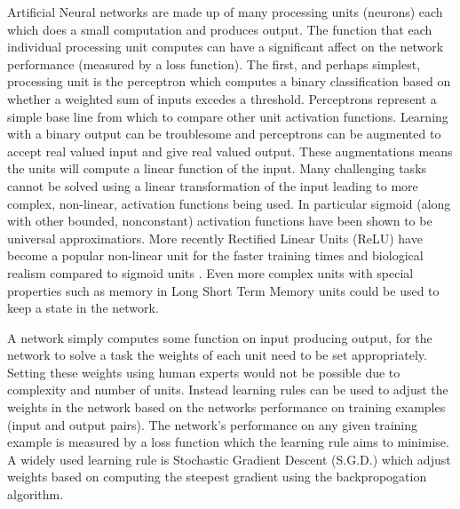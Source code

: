 Artificial Neural networks are made up of many processing units (neurons) each which does a small computation and produces output. 
The function that each individual processing unit computes can have a significant affect on the network performance (measured by a loss function). 
The first, and perhaps simplest, processing unit is the perceptron which computes a binary classification based on whether a weighted sum of inputs excedes a threshold.
Perceptrons represent a simple base line from which to compare other unit activation functions.
Learning with a binary output can be troublesome and perceptrons can be augmented to accept real valued input and give real valued output.
These augmentations means the units will compute a linear function of the input.
Many challenging tasks cannot be solved using a linear transformation of the input leading to more complex, non-linear, activation functions being used.
In particular sigmoid (along with other bounded, nonconstant) activation functions have been shown to be universal approximatiors\cite{hornik1991approximation}.
More recently Rectified Linear Units (ReLU) have become a popular non-linear unit\cite{lecun2015deep} for the faster training times and biological realism compared to sigmoid units \cite{glorot2011deep}.
Even more complex units with special properties such as memory in Long Short Term Memory units \cite{hochreiter1997long} could be used to keep a state in the network. 

A network simply computes some function on input producing output, for the network to solve a task the weights of each unit need to be set appropriately.
Setting these weights using human experts would not be possible due to complexity and number of units.
Instead learning rules can be used to adjust the weights in the network based on the networks performance on training examples (input and output pairs). 
The network's performance on any given training example is measured by a loss function which the learning rule aims to minimise. 
A widely used learning rule is Stochastic Gradient Descent (S.G.D.) which adjust weights based on computing the steepest gradient using the backpropogation algorithm\cite{Rumelhart1986}.


